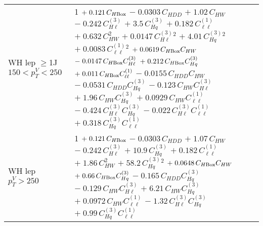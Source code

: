 \begin{tabular}{l|p{}}
    WH lep $\geq$1J $150 < p_{T}^{V} < 250$ & 1 $+\;0.121\,C_{H\rm{Box}}$ $-\;0.0303\,C_{HDD}$ $+\;1.02\,C_{HW}$ $-\;0.242\,C^{(3)}_{H\ell}$ $+\;3.5\,C^{(3)}_{Hq}$ $+\;0.182\,C^{(1)}_{\ell\ell}$ $+\;0.632\,C_{HW}^{2}$ $+\;0.0147\,C^{(3)}_{H\ell}^{2}$ $+\;4.01\,C^{(3)}_{Hq}^{2}$ $+\;0.0083\,C^{(1)}_{\ell\ell}^{2}$ $+\;0.0619\,C_{H\rm{Box}}C_{HW}$ $-\;0.0147\,C_{H\rm{Box}}C^{(3)}_{H\ell}$ $+\;0.212\,C_{H\rm{Box}}C^{(3)}_{Hq}$ $+\;0.011\,C_{H\rm{Box}}C^{(1)}_{\ell\ell}$ $-\;0.0155\,C_{HDD}C_{HW}$ $-\;0.0531\,C_{HDD}C^{(3)}_{Hq}$ $-\;0.123\,C_{HW}C^{(3)}_{H\ell}$ $+\;1.96\,C_{HW}C^{(3)}_{Hq}$ $+\;0.0929\,C_{HW}C^{(1)}_{\ell\ell}$ $-\;0.424\,C^{(3)}_{H\ell}C^{(3)}_{Hq}$ $-\;0.022\,C^{(3)}_{H\ell}C^{(1)}_{\ell\ell}$ $+\;0.318\,C^{(3)}_{Hq}C^{(1)}_{\ell\ell}$ \\
    WH lep $p_{T}^{V} > 250$ & 1 $+\;0.121\,C_{H\rm{Box}}$ $-\;0.0303\,C_{HDD}$ $+\;1.07\,C_{HW}$ $-\;0.242\,C^{(3)}_{H\ell}$ $+\;10.9\,C^{(3)}_{Hq}$ $+\;0.182\,C^{(1)}_{\ell\ell}$ $+\;1.86\,C_{HW}^{2}$ $+\;58.2\,C^{(3)}_{Hq}^{2}$ $+\;0.0648\,C_{H\rm{Box}}C_{HW}$ $+\;0.66\,C_{H\rm{Box}}C^{(3)}_{Hq}$ $-\;0.165\,C_{HDD}C^{(3)}_{Hq}$ $-\;0.129\,C_{HW}C^{(3)}_{H\ell}$ $+\;6.21\,C_{HW}C^{(3)}_{Hq}$ $+\;0.0972\,C_{HW}C^{(1)}_{\ell\ell}$ $-\;1.32\,C^{(3)}_{H\ell}C^{(3)}_{Hq}$ $+\;0.99\,C^{(3)}_{Hq}C^{(1)}_{\ell\ell}$ \\
\end{tabular}